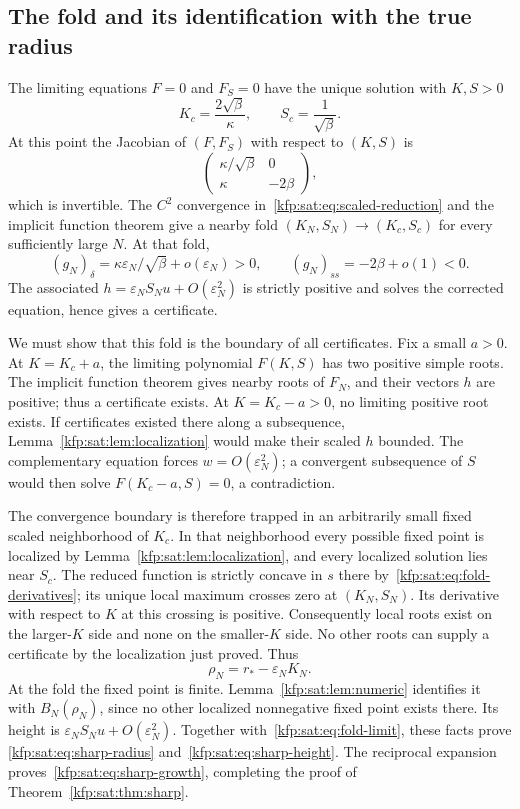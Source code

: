 \documentclass[11pt,a4paper]{article}
\theoremstyle{definition}
\theoremstyle{remark}
\begin{document}
\subsection{The fold and its identification with the true radius}
The limiting equations $F=0$ and $F_S=0$ have the unique solution with
$K,S>0$
\begin{equation}\label{kfp:sat:eq:fold-limit}
 K_c=\frac{2\sqrt\beta}{\kappa},\qquad S_c=\frac1{\sqrt\beta}.
\end{equation}
At this point the Jacobian of $(F,F_S)$ with respect to $(K,S)$ is
\[
 \begin{pmatrix}\kappa/\sqrt\beta&0\\ \kappa&-2\beta\end{pmatrix},
\]
which is invertible. The $C^2$ convergence in~\eqref{kfp:sat:eq:scaled-reduction}
and the implicit function theorem give a nearby fold
$(K_N,S_N)\to(K_c,S_c)$ for every sufficiently large $N$. At that fold,
\begin{equation}\label{kfp:sat:eq:fold-derivatives}
 (g_N)_\delta=\kappa\varepsilon_N/\sqrt\beta+o(\varepsilon_N)>0,
 \qquad (g_N)_{ss}=-2\beta+o(1)<0.
\end{equation}
The associated $h=\varepsilon_NS_Nu+O(\varepsilon_N^2)$ is strictly
positive and solves the corrected equation, hence gives a certificate.

We must show that this fold is the boundary of all certificates. Fix a
small $a>0$. At $K=K_c+a$, the limiting polynomial $F(K,S)$ has two
positive simple roots. The implicit function theorem gives nearby roots
of $F_N$, and their vectors $h$ are positive; thus a certificate exists.
At $K=K_c-a>0$, no limiting positive root exists. If certificates existed
there along a subsequence, Lemma~\ref{kfp:sat:lem:localization} would make their
scaled $h$ bounded. The complementary equation forces $w=O(\varepsilon_N^2)$;
a convergent subsequence of $S$ would then solve $F(K_c-a,S)=0$, a
contradiction.

The convergence boundary is therefore trapped in an arbitrarily small
fixed scaled neighborhood of $K_c$. In that neighborhood every possible
fixed point is localized by Lemma~\ref{kfp:sat:lem:localization}, and every
localized solution lies near $S_c$. The reduced function is strictly
concave in $s$ there by~\eqref{kfp:sat:eq:fold-derivatives}; its unique local maximum
crosses zero at $(K_N,S_N)$. Its derivative with respect to $K$ at this
crossing is positive. Consequently local roots exist on the larger-$K$
side and none on the smaller-$K$ side. No other roots can supply a
certificate by the localization just proved. Thus
\[
 \rho_N=r_*-\varepsilon_NK_N.
\]
At the fold the fixed point is finite. Lemma~\ref{kfp:sat:lem:numeric} identifies
it with $B_N(\rho_N)$, since no other localized nonnegative fixed point
exists there. Its height is
$\varepsilon_NS_Nu+O(\varepsilon_N^2)$.
Together with~\eqref{kfp:sat:eq:fold-limit}, these facts prove
\eqref{kfp:sat:eq:sharp-radius} and~\eqref{kfp:sat:eq:sharp-height}. The reciprocal
expansion proves~\eqref{kfp:sat:eq:sharp-growth}, completing the proof of
Theorem~\ref{kfp:sat:thm:sharp}.
\end{document}
